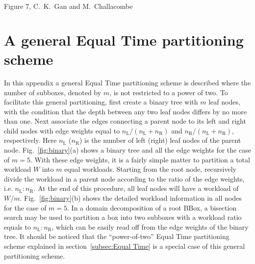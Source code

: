 \commentoutA{\documentclass[prl,aps,twocolumn,showpacs,twocolumngrid,superbib]{revtex4}}
\begin{document}
{\pagebreak
\begin{center}
Figure 7, C.~K.~Gan and M.~Challacombe \\[1.cm]
\end{center}
}

\clearpage
\appendix
\section{A general Equal Time partitioning scheme}
\label{appex:GET}
In this appendix a general Equal Time partitioning scheme is described where 
the number of subboxes, denoted by $m$, is not restricted to a power of two.
To facilitate this general 
partitioning, first create a binary tree with $m$ leaf nodes, with
the condition that the depth between any two leaf nodes differs by no more
than one. 
Next associate the edges connecting a parent node to its left and 
right child nodes with edge weights equal to 
$n_{\scriptscriptstyle\mathrm{L}}/(n_{\scriptscriptstyle\mathrm{L}}+n_{\scriptscriptstyle\mathrm{R}})$
and $n_{\scriptscriptstyle\mathrm{R}}/(n_{\scriptscriptstyle\mathrm{L}}+n_{\scriptscriptstyle\mathrm{R}})$, respectively. 
Here $n_{\scriptscriptstyle\mathrm{L}}$ ($n_{\scriptscriptstyle\mathrm{R}}$)
is the number of left (right) leaf nodes of the parent node. 
Fig.~\ref{fig:binary}(a) shows a binary tree and all the edge weights 
for the case of $m=5$.
With these edge weights, it is a fairly simple matter 
to partition a total workload $W$ into $m$ equal workloads. Starting
from the root node,
recursively divide the workload in a parent node
according to the ratio of the edge weights, 
i.e. $n_{\scriptscriptstyle\mathrm{L}} : n_{\scriptscriptstyle\mathrm{R}} $. 
At the end of this procedure, all
leaf nodes will have a workload of $W/m$. Fig.~\ref{fig:binary}(b) shows the 
detailed workload information in all nodes for the case of $m=5$. In a domain
decomposition of a root BBox, a bisection search may be used to partition
a box into two subboxes with a workload ratio equals to 
$n_{\scriptscriptstyle\mathrm{L}} : n_{\scriptscriptstyle\mathrm{R}}$,
which can be easily read off from the edge weights of the binary tree.
It should be noticed that the ``power-of-two'' Equal Time partitioning scheme 
explained in section~\ref{subsec:Equal Time} is a special 
case of this general partitioning scheme. 
\end{document}
